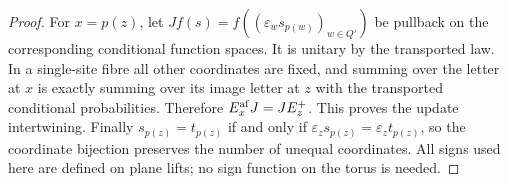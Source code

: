 \begin{proof}
For \(x=p(z)\), let \(Jf(s)=f((\varepsilon_w s_{p(w)})_{w\in Q'})\)
be pullback on the corresponding conditional function spaces.
It is unitary by the transported law. In a single-site fibre all
other coordinates are fixed, and summing over the letter at \(x\)
is exactly summing over its image letter at \(z\) with the
transported conditional probabilities. Therefore
\(E_x^{\rm af}J=J E_z^+\). This proves the update intertwining.
Finally \(s_{p(z)}=t_{p(z)}\) if and only if
\(\varepsilon_zs_{p(z)}=\varepsilon_zt_{p(z)}\), so the
coordinate bijection preserves the number of unequal coordinates.
All signs used here are defined on plane lifts; no sign function
on the torus is needed.
\end{proof}
